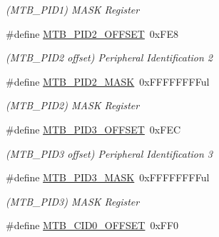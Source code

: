\begin{DoxyCompactItemize}
\begin{DoxyCompactList}\small\item\em (M\+T\+B\+\_\+\+P\+I\+D1) M\+A\+S\+K Register \end{DoxyCompactList}\item 
\hypertarget{group___s_a_m_l21___m_t_b_ga5874b570f2bf940372a6a3a9ba8d787d}{}\#define \hyperlink{group___s_a_m_l21___m_t_b_ga5874b570f2bf940372a6a3a9ba8d787d}{M\+T\+B\+\_\+\+P\+I\+D2\+\_\+\+O\+F\+F\+S\+E\+T}~0x\+F\+E8\label{group___s_a_m_l21___m_t_b_ga5874b570f2bf940372a6a3a9ba8d787d}

\begin{DoxyCompactList}\small\item\em (M\+T\+B\+\_\+\+P\+I\+D2 offset) Peripheral Identification 2 \end{DoxyCompactList}\item 
\hypertarget{group___s_a_m_l21___m_t_b_ga5999232178e1cf4fbd656413827f2a0c}{}\#define \hyperlink{group___s_a_m_l21___m_t_b_ga5999232178e1cf4fbd656413827f2a0c}{M\+T\+B\+\_\+\+P\+I\+D2\+\_\+\+M\+A\+S\+K}~0x\+F\+F\+F\+F\+F\+F\+F\+Ful\label{group___s_a_m_l21___m_t_b_ga5999232178e1cf4fbd656413827f2a0c}

\begin{DoxyCompactList}\small\item\em (M\+T\+B\+\_\+\+P\+I\+D2) M\+A\+S\+K Register \end{DoxyCompactList}\item 
\hypertarget{group___s_a_m_l21___m_t_b_ga1d873b31755ae6e7f7d67f946d740cc7}{}\#define \hyperlink{group___s_a_m_l21___m_t_b_ga1d873b31755ae6e7f7d67f946d740cc7}{M\+T\+B\+\_\+\+P\+I\+D3\+\_\+\+O\+F\+F\+S\+E\+T}~0x\+F\+E\+C\label{group___s_a_m_l21___m_t_b_ga1d873b31755ae6e7f7d67f946d740cc7}

\begin{DoxyCompactList}\small\item\em (M\+T\+B\+\_\+\+P\+I\+D3 offset) Peripheral Identification 3 \end{DoxyCompactList}\item 
\hypertarget{group___s_a_m_l21___m_t_b_gaccb41542d8ea9c7a2e17e754b3491bf4}{}\#define \hyperlink{group___s_a_m_l21___m_t_b_gaccb41542d8ea9c7a2e17e754b3491bf4}{M\+T\+B\+\_\+\+P\+I\+D3\+\_\+\+M\+A\+S\+K}~0x\+F\+F\+F\+F\+F\+F\+F\+Ful\label{group___s_a_m_l21___m_t_b_gaccb41542d8ea9c7a2e17e754b3491bf4}

\begin{DoxyCompactList}\small\item\em (M\+T\+B\+\_\+\+P\+I\+D3) M\+A\+S\+K Register \end{DoxyCompactList}\item 
\hypertarget{group___s_a_m_l21___m_t_b_ga6455f5f813f3e0c3e81803b8db5ac512}{}\#define \hyperlink{group___s_a_m_l21___m_t_b_ga6455f5f813f3e0c3e81803b8db5ac512}{M\+T\+B\+\_\+\+C\+I\+D0\+\_\+\+O\+F\+F\+S\+E\+T}~0x\+F\+F0\label{group___s_a_m_l21___m_t_b_ga6455f5f813f3e0c3e81803b8db5ac512}


\end{DoxyCompactItemize}
